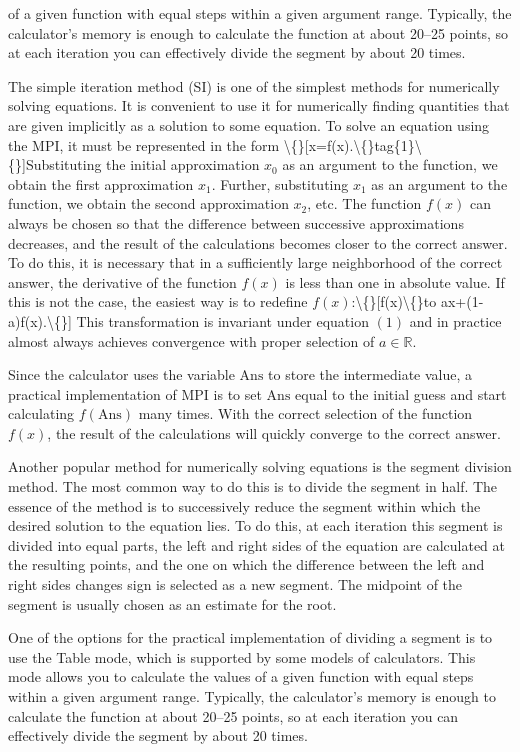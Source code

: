 \documentclass[11pt,a4paper]{article}
\begin{document}
​​of a given function with equal steps within a given argument range. Typically, the calculator's memory is enough to calculate the function at about 20–25 points, so at each iteration you can effectively divide the segment by about 20 times.

The simple iteration method (SI) is one of the simplest methods for numerically solving equations. It is convenient to use it for numerically finding quantities that are given implicitly as a solution to some equation. To solve an equation using the MPI, it must be represented in the form \textbackslash\{\}[x=f(x).\textbackslash\{\}tag\{1\}\textbackslash\{\}]Substituting the initial approximation $x_0$ as an argument to the function, we obtain the first approximation $x_1$. Further, substituting $x_1$ as an argument to the function, we obtain the second approximation $x_2$, etc. The function $f(x)$ can always be chosen so that the difference between successive approximations decreases, and the result of the calculations becomes closer to the correct answer. To do this, it is necessary that in a sufficiently large neighborhood of the correct answer, the derivative of the function $f(x)$ is less than one in absolute value. If this is not the case, the easiest way is to redefine $f(x)$:\textbackslash\{\}[f(x)\textbackslash\{\}to ax+(1-a)f(x).\textbackslash\{\}] This transformation is invariant under equation $(1)$ and in practice almost always achieves convergence with proper selection of $a\in \mathbb R$.

Since the calculator uses the variable $\mathrm{Ans}$ to store the intermediate value, a practical implementation of MPI is to set $\mathrm{Ans}$ equal to the initial guess and start calculating $f(\mathrm{Ans})$ many times. With the correct selection of the function $f(x)$, the result of the calculations will quickly converge to the correct answer.

Another popular method for numerically solving equations is the segment division method. The most common way to do this is to divide the segment in half. The essence of the method is to successively reduce the segment within which the desired solution to the equation lies. To do this, at each iteration this segment is divided into equal parts, the left and right sides of the equation are calculated at the resulting points, and the one on which the difference between the left and right sides changes sign is selected as a new segment. The midpoint of the segment is usually chosen as an estimate for the root.

One of the options for the practical implementation of dividing a segment is to use the Table mode, which is supported by some models of calculators. This mode allows you to calculate the values ​​of a given function with equal steps within a given argument range. Typically, the calculator's memory is enough to calculate the function at about 20–25 points, so at each iteration you can effectively divide the segment by about 20 times.
\end{document}
